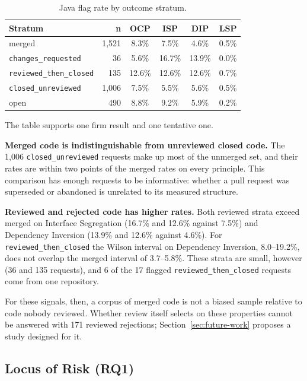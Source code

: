 \begin{table}[htb]
\centering
\caption{Java flag rate by outcome stratum.}
\label{tab:outcome-stratum}
\begin{tabular}{@{}lrcccc@{}}
\toprule
\textbf{Stratum} & \textbf{n} & \textbf{OCP} & \textbf{ISP} & \textbf{DIP} & \textbf{LSP} \\
\midrule
merged & 1{,}521 & 8.3\% & 7.5\% & 4.6\% & 0.5\% \\
\midrule
\texttt{changes\_requested} & 36 & 5.6\% & 16.7\% & 13.9\% & 0.0\% \\
\texttt{reviewed\_then\_closed} & 135 & 12.6\% & 12.6\% & 12.6\% & 0.7\% \\
\texttt{closed\_unreviewed} & 1{,}006 & 7.5\% & 5.5\% & 5.6\% & 0.5\% \\
\midrule
open & 490 & 8.8\% & 9.2\% & 5.9\% & 0.2\% \\
\bottomrule
\end{tabular}
\end{table}

The table supports one firm result and one tentative one.

\textbf{Merged code is indistinguishable from unreviewed closed code.} The 1{,}006
\texttt{closed\_unreviewed} requests make up most of the unmerged set, and their rates are within
two points of the merged rates on every principle. This comparison has enough requests to be
informative: whether a pull request was superseded or abandoned is unrelated to its measured
structure.

\textbf{Reviewed and rejected code has higher rates.} Both reviewed strata exceed merged on
Interface Segregation (16.7\% and 12.6\% against 7.5\%) and Dependency Inversion (13.9\% and 12.6\%
against 4.6\%). For \texttt{reviewed\_then\_closed} the Wilson interval on Dependency Inversion,
8.0--19.2\%, does not overlap the merged interval of 3.7--5.8\%. These strata are small, however (36
and 135 requests), and 6 of the 17 flagged \texttt{reviewed\_then\_closed} requests come from one
repository.

For these signals, then, a corpus of merged code is not a biased sample relative to code nobody
reviewed. Whether review itself selects on these properties cannot be answered with 171 reviewed
rejections; Section~\ref{sec:future-work} proposes a study designed for it.

\subsection{Locus of Risk (RQ1)}
\label{sec:locus-of-risk}


